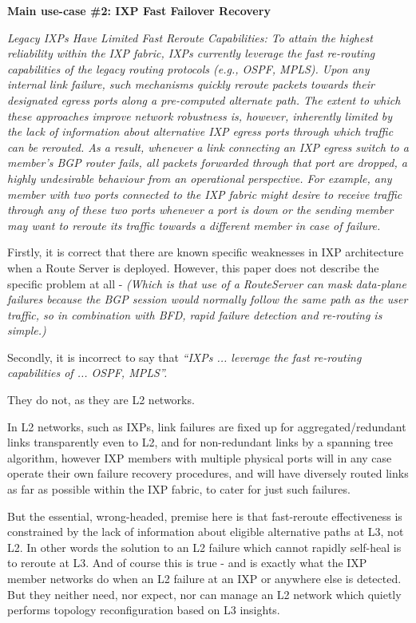 
\textbf{Main use-case \#2: IXP Fast Failover Recovery}

\textit{Legacy IXPs Have Limited Fast Reroute Capabilities: To attain the highest reliability within the IXP fabric, IXPs currently leverage the fast re-routing capabilities of the legacy routing protocols (e.g., OSPF, MPLS).
\smallskip
Upon any internal link failure, such mechanisms quickly reroute packets towards their designated egress ports along a pre-computed alternate path. The extent to which these approaches improve network robustness is, however, inherently limited by the lack of information about alternative IXP egress ports through which traffic can be rerouted. As a result, whenever a link connecting an IXP egress switch to a member's BGP router fails, all packets forwarded through that port are dropped, a highly undesirable behaviour from an operational perspective. For example, any member with two ports connected to the IXP fabric might desire to receive traffic through any of these two ports whenever a port is down or the sending member may want to reroute its traffic towards a different member in case of failure.}


\medskip

Firstly, it is correct that there are known specific weaknesses in IXP architecture when a Route Server is deployed.
However, this paper does not describe the specific problem at all - \emph{(Which is that use of a RouteServer can mask data-plane failures because the BGP session would normally follow the same path as the user traffic, so in combination with BFD, rapid failure detection and re-routing is simple.)}

\medskip

Secondly, it is incorrect to say that \emph{“IXPs ... leverage the fast re-routing capabilities of ... OSPF,  MPLS”.}


They do not, as they are L2 networks.


In L2 networks, such as IXPs, link failures are fixed up for aggregated/redundant links transparently even to L2, and for non-redundant links by a spanning tree algorithm, however IXP members with multiple physical ports will in any case operate their own failure recovery procedures, and will have diversely routed links as far as possible within the IXP fabric, to cater for just such failures.

But the essential, wrong-headed, premise here is that fast-reroute effectiveness is constrained by the lack of information about eligible alternative paths at L3, not L2.
In other words the solution to an L2 failure which cannot rapidly self-heal is to reroute at L3.
And of course this is true - and is exactly what the IXP member networks do when an L2 failure at an IXP or anywhere else is detected.
But they neither need, nor expect, nor can manage an L2 network which quietly performs topology reconfiguration based on L3 insights.

